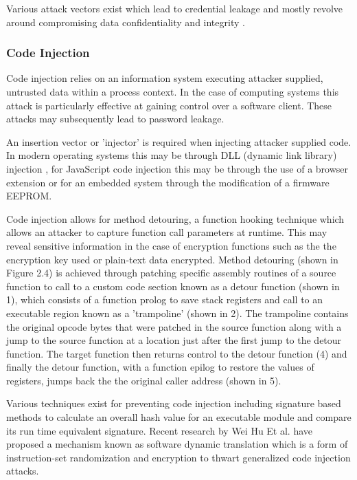 Various attack vectors exist which lead to credential leakage and mostly revolve around compromising data confidentiality and integrity \cite{embedded_security}.


\subsubsection{Code Injection}
Code injection relies on an information system executing attacker supplied, untrusted data within a process context. In the case of computing systems this attack is particularly effective at gaining control over a software client. These attacks may subsequently lead to password leakage.

An insertion vector or 'injector' is required when injecting attacker supplied code. In modern operating systems this may be through DLL (dynamic link library) injection \cite{game_hacking}, for JavaScript code injection this may be through the use of a browser extension or for an embedded system through the modification of a firmware EEPROM. 

Code injection allows for method detouring, a function hooking technique which allows an attacker to capture function call parameters at runtime. This may reveal sensitive information in the case of encryption functions such as the the encryption key used or plain-text data encrypted. Method detouring (shown in Figure 2.4) is achieved through patching specific assembly routines of a source function to call to a custom code section known as a detour function (shown in 1), which consists of a function prolog to save stack registers and call to an executable region known as a 'trampoline' (shown in 2). The trampoline contains the original opcode bytes that were patched in the source function along with a jump to the source function at a location just after the first jump to the detour function. The target function then returns control to the detour function (4) and finally the detour function, with a function epilog to restore the values of registers, jumps back the the original caller address (shown in 5)\cite{code_injection}.

Various techniques exist for preventing code injection including signature based methods to calculate an overall hash value for an executable module and compare its run time equivalent signature. Recent research by Wei Hu Et al. \cite{code_injection2} have proposed a mechanism known as software dynamic translation which is a form of instruction-set randomization and encryption to thwart generalized code injection attacks.

